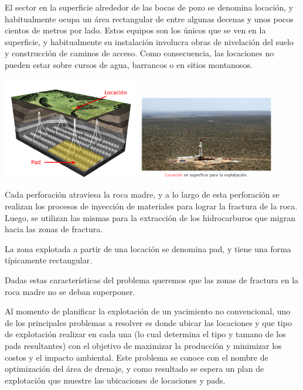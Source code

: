 El sector en la superficie alrededor de las bocas de pozo se denomina locaci\'on, y habitualmente ocupa un \'area rectangular de entre algunas decenas y unos pocos cientos de metros por lado. Estos equipos son los \'unicos que se ven en la superficie, y habitualmente su instalaci\'on involucra obras de nivelaci\'on del suelo y construcci\'on de caminos de acceso. Como consecuencia, las locaciones no pueden estar sobre cursos de agua, barrancos o en sitios montanosos.

\begin{center}
\includegraphics[width=0.45\textwidth]{imagenes/figura2}
\includegraphics[width=0.45\textwidth]{imagenes/figura3}
\end{center}

Cada perforaci\'on atraviesa la roca madre, y a lo largo de esta perforaci\'on
se realizan los procesos de inyecci\'on de materiales para lograr la fractura de
la roca. Luego, se utilizan las mismas para la extracci\'on de los hidrocarburos
que migran hacia las zonas de fractura.

La zona
explotada a partir de una locaci\'on se denomina pad, y tiene una forma t\'ipicamente
rectangular.

Dadas estas caracter\'isticas del problema queremos que las zonas de fractura en la roca madre no se deban superponer.


Al momento de planificar la explotaci\'on de un yacimiento no convencional,
uno de los principales problemas a resolver es donde ubicar las locaciones y
que tipo de explotaci\'on realizar en cada una (lo cual determina el tipo y
tamano de los pads resultantes) con el objetivo de maximizar la producci\'on
y minimizar los costos y el impacto ambiental. Este problema se conoce con
el nombre de optimizaci\'on del \'area de drenaje, y como resultado se espera un
plan de explotaci\'on que muestre las ubicaciones de locaciones y pads.


